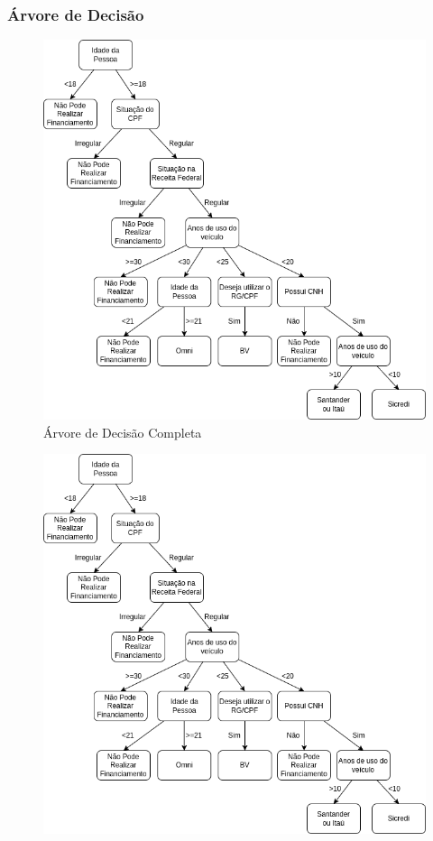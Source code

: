 \documentclass[12pt]{beamer}
\begin{document}
\begin{frame}[allowframebreaks]
    \frametitle{Árvore de Decisão}
    
    \begin{figure}
        \centering
        \includegraphics[height=.67\textheight]{arvore_completa.png}
        \caption{Árvore de Decisão Completa}
    \end{figure}
    \framebreak
    \begin{figure}
        \centering
        \includegraphics[height=.67\textheight]{arvore_completa.png}

\end{figure}
\end{frame}
\end{document}
